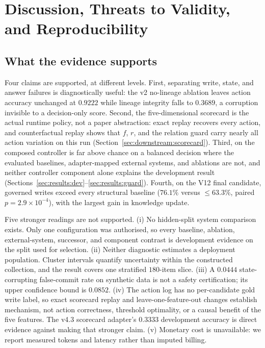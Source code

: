 \section{Discussion, Threats to Validity, and Reproducibility}
\label{sec:limitations}

\subsection{What the evidence supports}

Four claims are supported, at different levels. First, separating write, state,
and answer failures is diagnostically useful: the v2 no-lineage ablation leaves
action accuracy unchanged at $0.9222$ while lineage integrity falls to
$0.3689$, a corruption invisible to a decision-only score. Second, the
five-dimensional scorecard is the actual \lme{} runtime policy, not a paper
abstraction: exact replay recovers every action, and counterfactual replay shows
that $f$, $r$, and the relation guard carry nearly all action variation on this
run (Section~\ref{sec:downstream:scorecard}). Third, on \mgpc{} the composed
controller is far above chance on a balanced decision where the evaluated
baselines, adapter-mapped external systems, and ablations are not, and neither
controller component alone explains the development result
(Sections~\ref{sec:results:dev}--\ref{sec:results:guard}). Fourth, on the
V12 \lme{} final candidate, governed writes exceed every structural baseline
($76.1\%$ versus $\le 63.3\%$, paired $p=2.9\times10^{-4}$), with the largest
gain in knowledge update.

Five stronger readings are not supported. (i) No \mgpc{} hidden-split system
comparison exists. Only one configuration was authorised, so every baseline,
ablation, external-system, successor, and component contrast is development
evidence on the split used for selection. (ii) Neither diagnostic estimates a
deployment population. Cluster intervals quantify uncertainty within the
constructed \mgpc{} collection, and the \lme{} result covers one stratified
$180$-item slice. (iii) A $0.0444$ state-corrupting false-commit rate on
synthetic data is not a safety certification; its upper confidence bound is
$0.0852$. (iv) The \lme{} action log has no per-candidate gold write label, so
exact scorecard replay and leave-one-feature-out changes establish mechanism,
not action correctness, threshold optimality, or a causal benefit of the five
features. The v4.3 scorecard adapter's $0.3333$ development accuracy is direct
evidence against making that stronger claim. (v) Monetary cost is unavailable:
we report measured tokens and latency rather than imputed billing.

